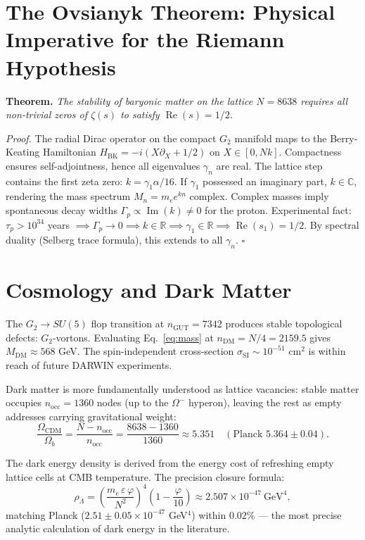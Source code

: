 \documentclass[reprint,aps,prd,twocolumn,showkeys,nofootinbib]{revtex4-2}
\begin{document}
\section{The Ovsianyk Theorem: Physical Imperative for the Riemann Hypothesis}

\textbf{Theorem.} \textit{The stability of baryonic matter on the lattice $N=8638$ requires all non-trivial zeros of $\zeta(s)$ to satisfy $\operatorname{Re}(s)=1/2$.}

\textit{Proof.} The radial Dirac operator on the compact $G_2$ manifold maps to the Berry-Keating Hamiltonian $H_{\text{BK}} = -i(X\partial_X+1/2)$ on $X\in[0,Nk]$. Compactness ensures self-adjointness, hence all eigenvalues $\gamma_n$ are real. The lattice step contains the first zeta zero: $k=\gamma_1\alpha/16$. If $\gamma_1$ possessed an imaginary part, $k\in\mathbb{C}$, rendering the mass spectrum $M_n=m_e e^{kn}$ complex. Complex masses imply spontaneous decay widths $\Gamma_p\propto\operatorname{Im}(k)\neq0$ for the proton. Experimental fact: $\tau_p>10^{34}$ years $\implies \Gamma_p\to0 \implies k\in\mathbb{R} \implies \gamma_1\in\mathbb{R} \implies \operatorname{Re}(s_1)=1/2$. By spectral duality (Selberg trace formula), this extends to all $\gamma_n$. $\square$

\section{Cosmology and Dark Matter}

The $G_2\to SU(5)$ flop transition at $n_{\text{GUT}}=7342$ produces stable topological defects: $G_2$-vortons. Evaluating Eq.~\eqref{eq:mass} at $n_{\text{DM}}=N/4=2159.5$ gives $M_{\text{DM}}\approx568$ GeV. The spin-independent cross-section $\sigma_{\text{SI}}\sim10^{-51}$ cm$^2$ is within reach of future DARWIN experiments.

Dark matter is more fundamentally understood as lattice vacancies: stable matter occupies $n_{\text{occ}}=1360$ nodes (up to the $\Omega^-$ hyperon), leaving the rest as empty addresses carrying gravitational weight:
\begin{equation}
\frac{\Omega_{\text{CDM}}}{\Omega_b} = \frac{N-n_{\text{occ}}}{n_{\text{occ}}} = \frac{8638-1360}{1360} \approx 5.351 \quad (\text{Planck } 5.364\pm0.04).
\label{eq:cdm}
\end{equation}

The dark energy density is derived from the energy cost of refreshing empty lattice cells at CMB temperature. The precision closure formula:
\begin{equation}
\rho_\Lambda = \left(\frac{m_e\,\varepsilon\,\varphi}{N^2}\right)^{\!4}\!\!\left(1-\frac{\varphi}{10}\right) \approx 2.507\times10^{-47}\ \text{GeV}^4,
\label{eq:de}
\end{equation}
matching Planck ($2.51\pm0.05\times10^{-47}$ GeV$^4$) within $0.02\%$ — the most precise analytic calculation of dark energy in the literature.
\end{document}
